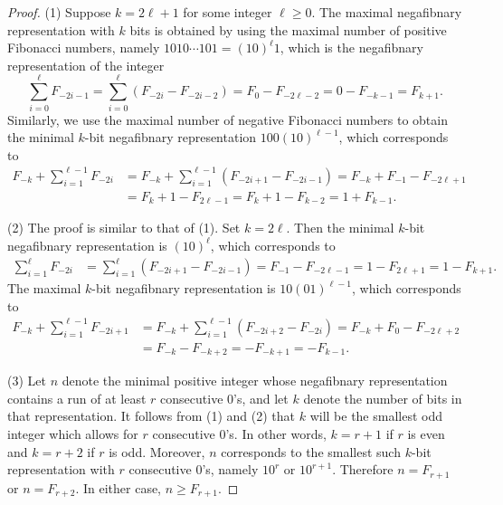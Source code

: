 \documentclass[reqno]{amsart}
\theoremstyle{definition}
\begin{document}
\begin{proof}
    (1) Suppose $k=2\ell + 1$ for some integer $\ell\geq 0$. The maximal negafibnary representation with $k$ bits is obtained by using the maximal number of positive Fibonacci numbers, namely $1010\cdots101=(10)^\ell 1$, which is the negafibnary representation of the integer
    \[\sum_{i=0}^\ell F_{-2i-1} = \sum_{i=0}^\ell \left(F_{-2i} - F_{-2i-2}\right) = F_0-F_{-2\ell-2} = 0-F_{-k-1}=F_{k+1}.\]
    Similarly, we use the maximal number of negative Fibonacci numbers to obtain the minimal $k$-bit negafibnary representation $100(10)^{\ell-1}$, which corresponds to 
    \begin{align*}
        F_{-k}+\sum_{i=1}^{\ell-1} F_{-2i} 
        & = F_{-k}+\sum_{i=1}^{\ell-1} \left(F_{-2i+1} - F_{-2i-1}\right) = F_{-k} + F_{-1}-F_{-2\ell+1} \\
        & = F_{k}+1-F_{2\ell-1} = F_{k}+1-F_{k-2} = 1+F_{k-1}.
    \end{align*}

    (2) The proof is similar to that of (1). Set $k=2\ell$. Then the minimal $k$-bit negafibnary representation is $(10)^\ell$, which corresponds to 
    \begin{align*}
        \sum_{i=1}^{\ell} F_{-2i} 
        & = \sum_{i=1}^{\ell} \left(F_{-2i+1} - F_{-2i-1}\right) = F_{-1} -F_{-2\ell-1} 
         = 1-F_{2\ell+1} = 1-F_{k+1}.
    \end{align*}
    The maximal $k$-bit negafibnary representation is $10(01)^{\ell-1}$, which corresponds to 
    \begin{align*}
        F_{-k}+\sum_{i=1}^{\ell-1} F_{-2i+1} 
        & = F_{-k}+\sum_{i=1}^{\ell-1} \left(F_{-2i+2} - F_{-2i}\right) = F_{-k}+F_{0}-F_{-2\ell+2} \\ 
        & = F_{-k}-F_{-k+2} = -F_{-k+1}  = -F_{k-1}.
    \end{align*}

    (3) Let $n$ denote the minimal positive integer whose negafibnary representation contains a run of at least $r$ consecutive 0's, and let $k$ denote the number of bits in that representation. It follows from (1) and (2) that $k$ will be the smallest odd integer which allows for $r$ consecutive $0$'s. In other words, $k=r+1$ if $r$ is even and $k=r+2$ if $r$ is odd. Moreover, $n$ corresponds to the smallest such $k$-bit representation with $r$ consecutive 0's, namely $10^r$ or $10^{r+1}$. Therefore $n=F_{r+1}$ or $n=F_{r+2}$. In either case, $n\geq F_{r+1}$.
\end{proof}
\end{document}
